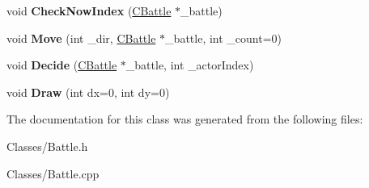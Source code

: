 \begin{DoxyCompactItemize}
\item 
void {\bfseries Check\+Now\+Index} (\hyperlink{class_c_battle}{C\+Battle} $\ast$\+\_\+battle)\hypertarget{class_c_battle_1_1_c_target_marker_a98d66637a90cc70b4b8597eaaa90115c}{}\label{class_c_battle_1_1_c_target_marker_a98d66637a90cc70b4b8597eaaa90115c}

\item 
void {\bfseries Move} (int \+\_\+dir, \hyperlink{class_c_battle}{C\+Battle} $\ast$\+\_\+battle, int \+\_\+count=0)\hypertarget{class_c_battle_1_1_c_target_marker_a18d3ef725310c1b767aeb982a57c9406}{}\label{class_c_battle_1_1_c_target_marker_a18d3ef725310c1b767aeb982a57c9406}

\item 
void {\bfseries Decide} (\hyperlink{class_c_battle}{C\+Battle} $\ast$\+\_\+battle, int \+\_\+actor\+Index)\hypertarget{class_c_battle_1_1_c_target_marker_a50bd363126ce97b9e8a07c1fcd58f903}{}\label{class_c_battle_1_1_c_target_marker_a50bd363126ce97b9e8a07c1fcd58f903}

\item 
void {\bfseries Draw} (int dx=0, int dy=0)\hypertarget{class_c_battle_1_1_c_target_marker_a8fe86f2f5aa3e189ff8a671095cc3eee}{}\label{class_c_battle_1_1_c_target_marker_a8fe86f2f5aa3e189ff8a671095cc3eee}

\end{DoxyCompactItemize}


The documentation for this class was generated from the following files\+:\begin{DoxyCompactItemize}
\item 
Classes/Battle.\+h\item 
Classes/Battle.\+cpp\end{DoxyCompactItemize}
